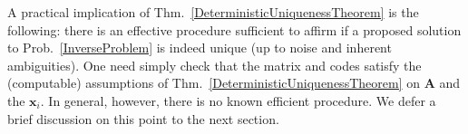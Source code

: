 \documentclass[journal, twocolumn]{IEEEtran}
\begin{document}
A practical implication of Thm.~\ref{DeterministicUniquenessTheorem} is the following: there is an effective procedure sufficient to affirm if a proposed solution to Prob.~\ref{InverseProblem} is indeed unique (up to noise and inherent ambiguities). One need simply check that the matrix and codes satisfy the (computable) assumptions of Thm.~\ref{DeterministicUniquenessTheorem} on $\mathbf{A}$ and the $\mathbf{x}_i$. In general, however, there is no known efficient procedure. We defer a brief discussion on this point to the next section.


\end{document}
